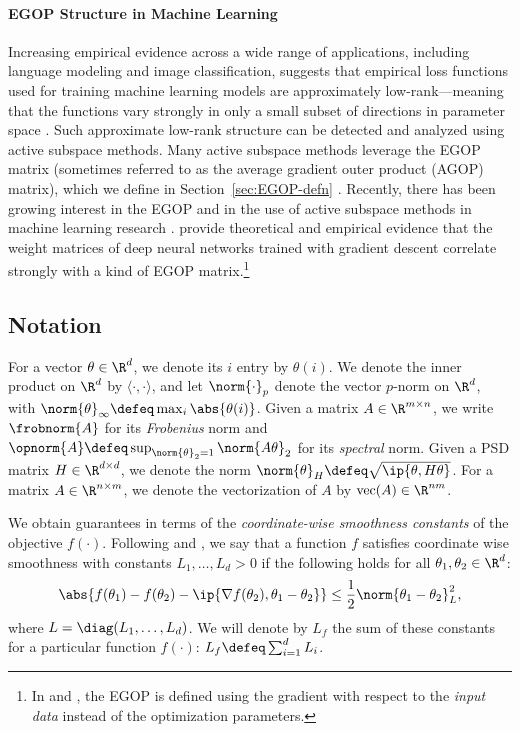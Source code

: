 \documentclass{article}
\begin{document}
\paragraph{EGOP Structure in Machine Learning}
    Increasing empirical evidence across a wide range of applications, including language modeling and image classification, suggests that empirical loss functions used for training machine learning models are approximately low-rank---meaning that the functions vary strongly in only a small subset of directions in parameter space \citet{papyan2018full,sagun2017empirical,  zhang2024transformers}. Such approximate low-rank structure can be detected and analyzed using active subspace methods. Many active subspace methods leverage the EGOP matrix (sometimes referred to as the average gradient outer product (AGOP) matrix), which we define in Section~\ref{sec:EGOP-defn}  \cite{constantine2015active}. Recently, there has been growing interest in the EGOP and in the use of active subspace methods in machine learning research \cite{cui2020active, mallinar2024emergence,radhakrishnan2022mechanism,zhu2023catapults}. \citet{radhakrishnan2022mechanism} provide theoretical and empirical evidence that the weight matrices of deep neural networks trained with gradient descent correlate strongly with a kind of EGOP matrix.\footnote{In \citet{mallinar2024emergence,radhakrishnan2022mechanism} and \citet{zhu2023catapults}, the EGOP is defined using the gradient with respect to the \emph{input data} instead of the optimization parameters.}

\subsection{Notation}\label{ssec:notation}

For a vector $\theta \in \R^d$, we denote its $i$ entry by $\theta(i)$. We denote the inner product on $\R^d$ by $\langle \cdot, \cdot \rangle$, and let $\norm{\cdot}_p$ denote the vector $p$-norm on $\R^d$, with $\norm{\theta}_{\infty} \defeq \max_{i}\abs{\theta(i)}$. Given a matrix $A \in \R^{m \times n}$, we write $\frobnorm{A}$ for its \emph{Frobenius} norm and $\opnorm{A} \defeq \sup_{\norm{\theta}_2=1} \norm{A\theta}_2$ for its \emph{spectral} norm. Given a PSD matrix $H\in \R^{d\times d}$, we denote the norm $\norm{\theta}_{H} \defeq \sqrt{\ip{\theta, H\theta}}$. For a matrix $A \in \R^{n\times m}$, we denote the vectorization of $A$ by  $\operatorname{vec}(A) \in \R^{nm}$.

We obtain guarantees in terms of the \textit{coordinate-wise smoothness constants} of the objective $f(\cdot)$. Following \citet{jiang2024convergence} and \citet{liu2024adagrad}, we say that a function $f$ satisfies coordinate wise smoothness with constants $L_1,\dots,L_d > 0$ if the following holds for all
$\theta_1, \theta_2 \in \R^d$: 
\begin{equation}\label{eq:def-coordinate-wise-smoothness}
    \abs{f(\theta_1)-f(\theta_2) - \ip{\nabla f(\theta_2), \theta_1 - \theta_2}} \leq
    \frac{1}{2} \norm{\theta_1 - \theta_2}_{L}^2,
\end{equation}
where $L = \diag(L_1, \dots, L_{d})$. We will denote by $L_f$ the sum of these constants for a particular function $f(\cdot)$: $L_f\defeq \sum_{i=1}^d L_i$.
\end{document}
